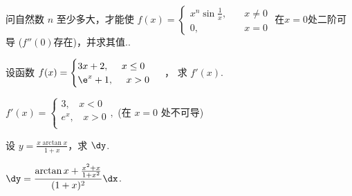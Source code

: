 \begin{problem}
	问自然数 $n$ 至少多大，才能使 $f(x) = \begin{cases}
x^{n}\sin\displaystyle \frac{1}{x},\quad   &x \neq 0\\
0,\quad   &x = 0 
\end{cases}$ 在$x=0$处二阶可导 ($f''\left( 0 \right)$存在)，并求其值..



\end{problem}




\begin{problem} 设函数 $f(x) = \begin{cases}
3x + 2,\ \ \ \  x \leq 0 \\
\e^{x} + 1,\ \ \ \  x > 0 \\
\end{cases} $ ， 求 $f'(x)$.

\begin{solution}
	$f'(x) =  \begin{cases}
3,\ \ \ \  x < 0 \\
e^{x},\ \ \ \  x > 0 \\
\end{cases},$ (在 $x = 0$ 处不可导)
\end{solution}

\end{problem}

\begin{problem} 设 $\displaystyle y = \frac{x\arctan x}{1 + x}$，求 ${\dy}$.

\begin{solution}
	$\displaystyle \dy = \frac{\arctan x + \frac{x^2+x}{1 + x^{2}}}{(1 + x)^{2}}\dx$.
\end{solution}

\end{problem}

